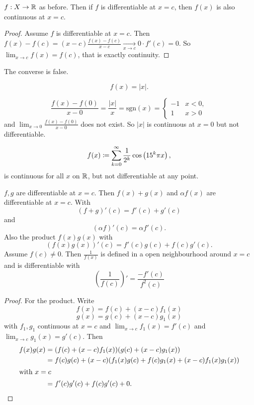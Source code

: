 \documentclass[10pt, a4paper]{article}
\begin{document}
\begin{proposition}
    $f : X \rightarrow \R$ as before.
    Then if $f$ is differentiable at $x = c$,
    then $f(x)$ is also continuous at $x = c$.

    \begin{proof}
        Assume $f$ is differentiable at $x = c$.
        Then $f(x) - f(c) = (x - c) \frac{f(x) - f(c)}{x - c} \xrightarrow[x \rightarrow c]{} 0 \cdot f'(c) = 0$.
        So $\lim_{x \rightarrow c}f(x) = f(c)$,
        that is exactly continuity.
    \end{proof}
\end{proposition}
The converse is false.
\begin{example}
    \[
    f(x) = |x|.
    \]

    \begin{solution}
        \[
        \frac{f(x) - f(0)}{x - 0} = \frac{|x|}{x} = \mathrm{sgn}(x) = \begin{cases}
            -1 & x < 0, \\
            1 & x > 0
        \end{cases}
        \]
        and $\lim_{x \rightarrow 0}\frac{f(x) - f(0)}{x - 0}$ does not exist.
        So $|x|$ is continuous at $x = 0$ but not differentiable.
    \end{solution}
\end{example}

\[
f(x) \coloneqq \infsum[k = 0]\frac{1}{2 ^ k}\cos\left(15 ^ k\pi x\right),
\]
is continuous for all $x$ on $\R$,
but not differentiable at any point.

\begin{theorem}
    $f, g$ are differentiable at $x = c$.
    Then $f(x) + g(x)$ and $\alpha f(x)$ are differentiable at $x = c$.
    With
    \[
    (f + g)'(c) = f'(c) + g'(c)
    \]
    and
    \[
    (\alpha f)'(c) = \alpha f'(c).
    \]
    Also the product $f(x)g(x)$ with
    \[
    (f(x)g(x))'(c) = f'(c)g(c) + f(c)g'(c).
    \]
    Assume $f(c) \neq 0$.
    Then $\frac{1}{f(x)}$ is defined in a open neighbourhood around $x = c$ and is differentiable with
    \[
    \left(\frac{1}{f(c)}\right)' = \frac{-f'(c)}{f ^ 2(c)}
    \]
    
    \begin{proof}
        For the product.
        Write
        \[
        f(x) = f(c) + (x - c)f_1(x)
        \]
        \[
        g(x) = g(c) + (x - c)g_1(x)
        \]
        with $f_1, g_1$ continuous at $x = c$ and $\lim_{x \rightarrow c}f_1(x) = f'(c)$ and $\lim_{x \rightarrow c}g_1(x) = g'(c)$.
        Then
        \begin{align*}
            f(x)g(x) &= (f(c) + (x - c)f_1(x))(g(c) + (x - c)g_1(x)) \\
            &= f(c)g(c) + (x - c)(f_1(x)g(c) + f(c)g_1(x) + (x - c)f_1(x)g_1(x)) \\
            \intertext{with $x = c$}
            &= f'(c)g'(c) + f(c)g'(c) + 0.
        \end{align*}
        \[
        \]
    \end{proof}
\end{theorem}
\end{document}
